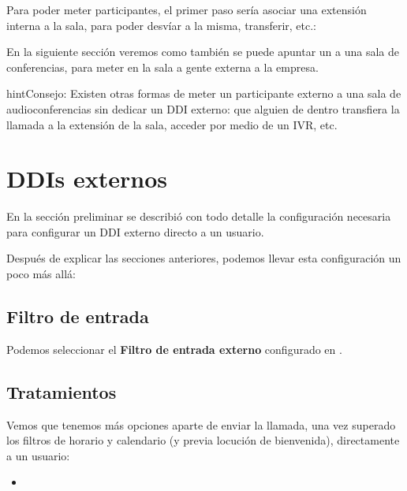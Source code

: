 \documentclass[letterpaper,10pt,spanish]{sphinxmanual}
\begin{document}
Para poder meter participantes, el primer paso sería asociar una extensión interna a la sala, para poder desvíar a la misma, transferir, etc.:

\noindent{}

En la siguiente sección veremos como también se puede apuntar un {\hyperref[pbx_features/external_ddis:external\string-ddis]{}} a una sala de conferencias, para meter en la sala a gente externa a la empresa.

\begin{notice}{hint}{Consejo:}
Existen otras formas de meter un participante externo a una sala de audioconferencias sin dedicar un DDI externo: que alguien de dentro transfiera la llamada a la extensión de la sala, acceder por medio de un IVR, etc.
\end{notice}


\section{DDIs externos}
\label{pbx_features/external_ddis:ddis-externos}\label{pbx_features/external_ddis:external-ddis}\label{pbx_features/external_ddis::doc}
En la sección preliminar {\hyperref[external_incoming_calls/configure_ddi:settingup\string-ddi]{}} se describió con todo detalle la configuración necesaria para configurar un DDI externo directo a un usuario.

Después de explicar las secciones anteriores, podemos llevar esta configuración un poco más allá:


\subsection{Filtro de entrada}
\label{pbx_features/external_ddis:filtro-de-entrada}
Podemos seleccionar el \textbf{Filtro de entrada externo} configurado en {\hyperref[pbx_features/external_filters:external\string-filters]{}}.

\noindent{}


\subsection{Tratamientos}
\label{pbx_features/external_ddis:routing-logics}\label{pbx_features/external_ddis:tratamientos}
Vemos que tenemos más opciones aparte de enviar la llamada, una vez superado los filtros de horario y calendario (y previa locución de bienvenida), directamente a un usuario:
\begin{itemize}
\item {} 
{\hyperref[pbx_features/huntgroups:huntgroups]{}}

\end{itemize}
\end{document}
